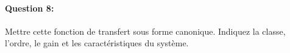 \paragraph{Question 8:} Mettre cette fonction de transfert sous forme canonique. Indiquez la classe, l'ordre, le gain et les caractéristiques du système.

%
%
%
%
%
%
%
%
%

\newpage


